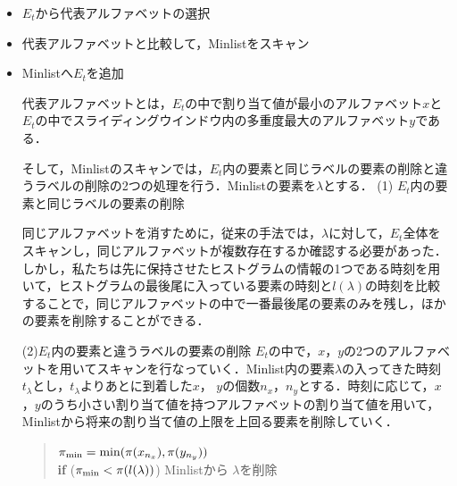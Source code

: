 \begin{itemize}
\item $E_t$から代表アルファベットの選択
\item 代表アルファベットと比較して，Minlistをスキャン
\item Minlistへ$E_t$を追加

代表アルファベットとは，$E_t$の中で割り当て値が最小のアルファベット$x$と$E_t$の中でスライディングウインドウ内の多重度最大のアルファベット$y$である．

そして，Minlistのスキャンでは，$E_t$内の要素と同じラベルの要素の削除と違うラベルの削除の2つの処理を行う．Minlistの要素を$\lambda$とする．
(1) $E_t$内の要素と同じラベルの要素の削除

同じアルファベットを消すために，従来の手法では，$\lambda$に対して，$E_t$全体をスキャンし，同じアルファベットが複数存在するか確認する必要があった．しかし，私たちは先に保持させたヒストグラムの情報の1つである時刻を用いて，ヒストグラムの最後尾に入っている要素の時刻と$l(\lambda)$の時刻を比較することで，同じアルファベットの中で一番最後尾の要素のみを残し，ほかの要素を削除することができる．

 (2)$E_t$内の要素と違うラベルの要素の削除
$E_t$の中で，$x$，$y$の2つのアルファベットを用いてスキャンを行なっていく．Minlist内の要素$\lambda$の入ってきた時刻$t_\lambda$とし，$t_\lambda$よりあとに到着した$x$， $y$の個数$n_x$，$n_y$とする．時刻に応じて，$x$，$y$のうち小さい割り当て値を持つアルファベットの割り当て値を用いて，Minlistから将来の割り当て値の上限を上回る要素を削除していく．

\begin{quote}
$\pi_{{\rm min}} = {\rm min}(\pi(x_{n_x}),\pi(y_{n_y}))$ \\
 {\bf if} ($\pi_{{\rm min}}<\pi(l(\lambda))$)  Minlistから $\lambda$を削除\\
\end{quote}




\end{itemize}
